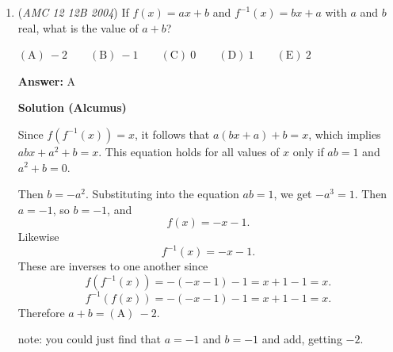 \begin{enumerate}
\textbf{Solution 2}

Note that the recurrence $a_n+a_{n+1}-a_{n+2}~=~a_{n+3}$ can be rewritten as $a_n+a_{n+1} ~=~ a_{n+2}+a_{n+3}$. 

 Hence we get that $a_1+a_2 ~=~ a_3+a_4 ~=~ a_5+a_6 ~= \cdots$ and also$a_2+a_3 ~=~ a_4+a_5 ~=~ a_6+a_7 ~= \cdots$

 From the values given in the problem statement we see that $a_3=a_1+2$. 

 From $a_1+a_2 = a_3+a_4$ we get that $a_4=a_2-2$.

 From $a_2+a_3 = a_4+a_5$ we get that $a_5=a_3+2$.

 Following this pattern, we get $a_{2004} = a_{2002} - 2 = a_{2000} - 4 = \cdots = a_2 - 2002 = \boxed{0}$.

 



\textbf{Solution 3}

Our recurrence is $a_n+a_{n+1}-a_{n+2}~=~a_{n+3}$, so we get $r^3+r^2-r-1 = 1$, so $(r-1)(r+1)^2 = 1$, so our formula for the recurrence is $a_n = A + (B + Cn)(-1)^n$.

 Substituting our starting values gives us $a_n = 2002 + (2 - n)(-1)^n$.

 So, $a_{2004} = 2002 - 2002 = 0.$



	\item (\textit{AMC 12 12B 2004}) If $f(x) = ax+b$ and $f^{-1}(x) = bx+a$ with $a$ and $b$ real, what is the value of $a+b$? 


 $\mathrm{(A)}\ -2 \qquad\mathrm{(B)}\ -1 \qquad\mathrm{(C)}\ 0 \qquad\mathrm{(D)}\ 1 \qquad\mathrm{(E)}\ 2$

 \textbf{Answer: }A



\textbf{Solution (Alcumus)}

Since $f(f^{-1}(x))=x$, it follows that $a(bx+a)+b=x$, which implies $abx + a^2 +b = x$. This equation holds for all values of $x$ only if $ab=1$ and $a^2+b=0$. 

 Then $b = -a^2$. Substituting into the equation $ab = 1$, we get $-a^3 = 1$. Then $a = -1$, so $b = -1$, and
 \[f(x)=-x-1.\]Likewise
 \[f^{-1}(x)=-x-1.\]These are inverses to one another since
 \[f(f^{-1}(x))=-(-x-1)-1=x+1-1=x.\]
 \[f^{-1}(f(x))=-(-x-1)-1=x+1-1=x.\]Therefore $a+b=\boxed{\mathrm{(A)}\ -2}$.

 note: you could just find that $a=-1$ and $b=-1$ and add, getting $-2$.


\end{enumerate}
